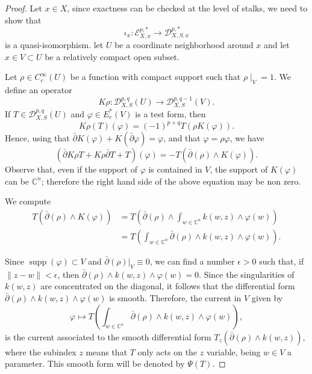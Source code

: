 \documentclass[10pt,twoside]{article}
\numberwithin{equation}{section}
\theoremstyle{plain}
\theoremstyle{definition}
\DeclareMathOperator{\supp}{supp}
\begin{document}
\begin{proof}
  Let $x\in X$, since exactness can be checked at the level of stalks,
  we need to show that
  \begin{displaymath}
    \iota_{x}\colon \mathscr{E}^{p,*}_{X,x}\longrightarrow \mathscr{D}^{p,*}_{X,S,x}
  \end{displaymath}
is a quasi-isomorphism.
let $U$ be a coordinate neighborhood around $x$ and let
  $x\in V\subset U$ be a relatively compact open subset.

  Let $\rho \in C_{c}^{\infty}(U)$ be a function with compact support
  such that $\rho \mid _{V}=1$. We define an operator
  \begin{displaymath}
    K\rho \colon\mathscr{D}^{p,q}_{X,S}(U)\longrightarrow
    \mathscr{D}^{p,q-1}_{X,S}(V).
  \end{displaymath}
  If $T\in \mathscr{D}^{p,q}_{X,S}(U)$ and $\varphi \in E_{c}^{\ast}(V)$
  is a test form, then
  \begin{displaymath}
    K\rho (T)(\varphi)=(-1)^{p+q}T(\rho K(\varphi)).
  \end{displaymath}
  Hence, using that $\bar \partial K(\varphi)+K(\bar \partial
  \varphi)=\varphi$,  and that
  $\varphi=\rho \varphi$, we have
  \begin{displaymath}
    (\bar \partial K\rho T + K\rho \bar \partial T +T)(\varphi)=
    -T(\bar \partial (\rho )\land K(\varphi)).
  \end{displaymath}
  Observe that, even if the support of $\varphi$ is contained in $V$,
  the support of $K(\varphi)$ can be $\mathbb{C}^{n}$; therefore the
  right hand side of the above equation may be non zero.

  We compute
  \begin{align*}
    T(\bar \partial (\rho )\land K(\varphi))&=
    T\left(\bar \partial (\rho)\land \int_{w\in
        \mathbb{C}^{n}}k(w,z)\land \varphi(w)
      \right)\\
      &=
      T\left(\int_{w\in
        \mathbb{C}^{n}}\bar \partial (\rho)\land k(w,z)\land
      \varphi(w) \right).
  \end{align*}

  Since $\supp(\varphi)\subset V$ and $\bar \partial (\rho)|_{V}\equiv
  0$, we can find a number $\epsilon >0$ such that, if
  $\|z-w\|<\epsilon $, then $\bar \partial (\rho)\land k(w,z)\land
      \varphi(w) =0$. Since the singularities of $k(w,z)$ are
      concentrated on the diagonal, it follows that 
  the differential form $\bar \partial (\rho)\land k(w,z)\land
  \varphi(w)$ is smooth. Therefore, the current in $V$ given by
  \begin{displaymath}
    \varphi\longmapsto T\left(\int_{w\in
        \mathbb{C}^{n}}\bar \partial (\rho)\land k(w,z)\land
      \varphi(w) \right),
  \end{displaymath}
  is the current associated to the smooth differential form 
  $T_{z}\left(\bar \partial (\rho)\land
    k(w,z)\right)$, where the subindex $z$ means that $T$ only acts on the
 $z$ variable, being $w\in V$ a parameter. This smooth form will be denoted by $\Psi (T)$.
  

\end{proof}
\end{document}
